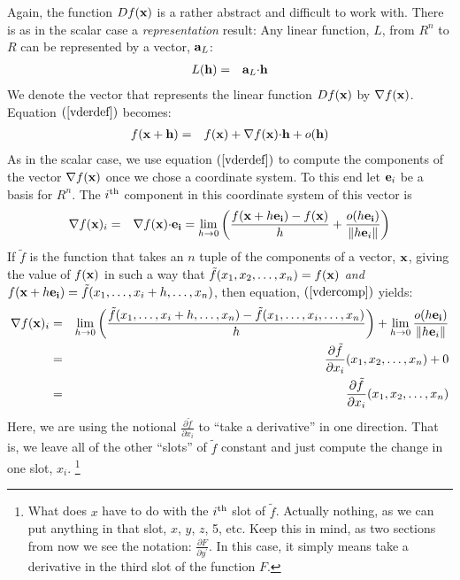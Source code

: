 \documentclass{article}
\begin{document}
Again, the function $Df({\bf x})$ is a rather abstract and difficult to work with.
There is as in the scalar case a {\em representation\/} result:
Any linear function, $L$, from $R^n$ to $R$ can be represented by a vector, ${\bf a}_L$:
\begin{eqnarray}
  L({\bf h}) & = & {\bf a}_L {\bf \cdot} {\bf h}
\end{eqnarray}
We denote the vector that represents the linear function $Df({\bf x})$ by
$\nabla f({\bf x})$. Equation $(\ref{vderdef})$ becomes:
\begin{eqnarray}
  f({\bf x} + {\bf h}) & = & f({\bf x}) + \nabla f({\bf x}) {\bf \cdot} {\bf h} + o({\bf h}) \label{vderdef2}
\end{eqnarray}
As in the scalar case, we use equation $(\ref{vderdef})$
to compute the components of the vector $\nabla f({\bf x})$ once we chose
a coordinate system. To this end let ${\bf e}_i$ be a basis for $R^n$. The $i^{\rm th}$
component in this coordinate system of this vector is
\begin{eqnarray}
  \nabla f({\bf x})_i & = &  \nabla f({\bf x}){\bf \cdot} {\bf e_i} =
  \lim_{h \rightarrow 0} \left( \frac{f({\bf x} + h {\bf e_i}) - f({\bf x})}{h} + \frac{o(h {\bf e_i})}{\|h {\bf e}_i\|}\right) \label{vdercomp}
\end{eqnarray}
If ${\tilde f}$
is the function that takes an $n$ tuple of the components of a vector, ${\bf x}$,
giving the value of $f({\bf x})$ in such a way that
${\tilde f}(x_1, x_2, \ldots, x_n) = f({\bf x})$ {\em and\/}
$f({\bf x} + h {\bf e_i}) = {\tilde f}(x_1, \ldots, x_i + h, \ldots, x_n)$,
then equation, $(\ref{vdercomp})$ yields:
\begin{eqnarray}
  \nabla f({\bf x})_i & = &
    \lim_{h \rightarrow 0} \left(\frac{{\tilde f}(x_1, \ldots, x_i + h, \ldots, x_n) - {\tilde f}(x_1, \ldots, x_i, \ldots, x_n)}{h}\right)
    + \lim_{h \rightarrow 0} \frac{o(h {\bf e_i})}{\|h {\bf e}_i\|}
    \nonumber \\
& = & \frac{\partial {\tilde f}}{\partial x_i}(x_1, x_2, \ldots, x_n) + 0 \nonumber \\
& = & \frac{\partial {\tilde f}}{\partial x_i}(x_1, x_2, \ldots, x_n)
\end{eqnarray}
 Here, we are using the notional $\frac{\partial {\tilde f}}{\partial x_i}$ to
``take a derivative''{} in one direction. That is, we leave all of the other ``slots''{}
of ${\tilde f}$ constant and just compute the change in one slot, $x_i$.%
\footnote{What does $x$ have to do with the $i^{\rm th}$ slot of ${\tilde f}$. Actually
nothing, as we can put anything in that slot, $x$, $y$, $z$, 5, etc. Keep this in mind,
as two sections from now we see the notation: $\frac{\partial F}{\partial y^\prime}$.
In this case, it simply means take a derivative in the third slot of the function $F$.}
\end{document}
